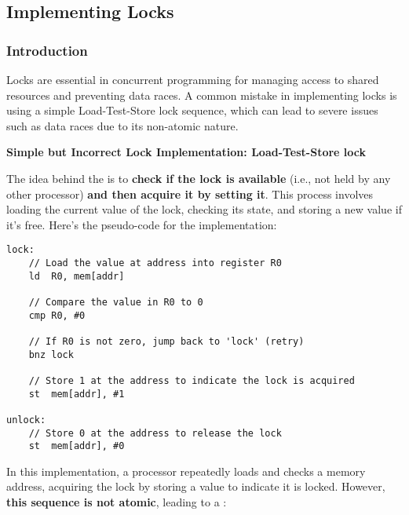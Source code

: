 \subsection{Implementing Locks}

\subsubsection{Introduction}

Locks are essential in concurrent programming for managing access to shared resources and preventing data races. A common mistake in implementing locks is using a simple Load-Test-Store lock sequence, which can lead to severe issues such as data races due to its non-atomic nature.

\highspace
\begin{flushleft}
    \textcolor{Red2}{ \textbf{Simple but Incorrect Lock Implementation: Load-Test-Store lock}}
\end{flushleft}
The idea behind the  is to \textbf{check if the lock is available} (i.e., not held by any other processor) \textbf{and then acquire it by setting it}. This process involves loading the current value of the lock, checking its state, and storing a new value if it's free. Here's the pseudo-code for the implementation:
\begin{lstlisting}
lock:
    // Load the value at address into register R0
    ld  R0, mem[addr]

    // Compare the value in R0 to 0
    cmp R0, #0

    // If R0 is not zero, jump back to 'lock' (retry)
    bnz lock

    // Store 1 at the address to indicate the lock is acquired
    st  mem[addr], #1

unlock:
    // Store 0 at the address to release the lock
    st  mem[addr], #0
\end{lstlisting}
In this implementation, a processor repeatedly loads and checks a memory address, acquiring the lock by storing a value to indicate it is locked. However, \textbf{this sequence is not atomic}, leading to a :
